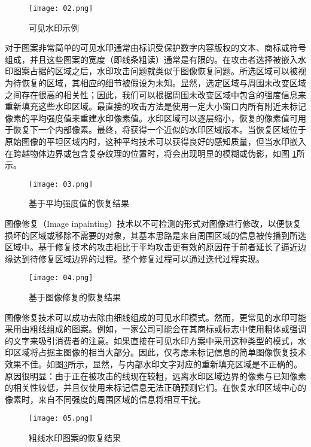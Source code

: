 \begin{figure}[!htbp]
	\centering
	\texttt{[image: 02.png]}
	\caption{可见水印示例}
\end{figure}

对于图案非常简单的可见水印通常由标识受保护数字内容版权的文本、商标或符号组成，并且这些图案的宽度（即线条粗读）通常是有限的。在攻击者选择被嵌入水印图案占据的区域之后，水印攻击问题就类似于图像恢复问题。所选区域可以被视为待恢复的区域，其相应的细节被假设为未知。显然，选定区域与周围未改变区域之间存在很高的相关性；因此，我们可以根据周围未改变区域中包含的强度信息来重新填充这些水印区域。最直接的攻击方法是使用一定大小窗口内所有附近未标记像素的平均强度值来重建水印像素值。水印区域可以逐层缩小，恢复的像素值可用于恢复下一个内部像素。最终，将获得一个近似的水印区域版本。当恢复区域位于原始图像的平坦区域内时，这种平均技术可以获得良好的感知质量，但当水印嵌入在跨越物体边界或包含复杂纹理的位置时，将会出现明显的模糊或伪影，如图 \ref{fig:03}所示。

\begin{figure}[!htbp]
	\centering
	\texttt{[image: 03.png]}
	\caption{基于平均强度值的恢复结果}
	\label{fig:03}
\end{figure}

图像修复（Image inpainting）技术以不可检测的形式对图像进行修改，以便恢复损坏的区域或移除不需要的对象，其基本思路是来自周围区域的信息被传播到所选区域中。基于修复技术的攻击相比于平均攻击更有效的原因在于前者延长了逼近边缘达到待修复区域边界的过程。整个修复过程可以通过迭代过程实现。

\begin{figure}[!htbp]
	\centering
	\texttt{[image: 04.png]}
	\caption{基于图像修复的恢复结果}
	\label{fig:04}
\end{figure}

图像修复技术可以成功去除由细线组成的可见水印模式。然而，更常见的水印可能采用由粗线组成的图案。例如，一家公司可能会在其商标或标志中使用粗体或强调的文字来吸引消费者的注意。如果直接在可见水印方案中采用这种类型的模式，水印区域将占据主图像的相当大部分。因此，仅考虑未标记信息的简单图像恢复技术效果不佳。如图\ref{fig:05}所示，显然，与内部水印文字对应的重新填充区域是不正确的。原因很明显：由于正在被攻击的线现在较粗，远离水印区域边界的像素与已知像素的相关性较低，并且仅使用未标记信息无法正确预测它们。在恢复水印区域中心的像素时，来自不同强度的周围区域的信息将相互干扰。

\begin{figure}[!htbp]
	\centering
	\texttt{[image: 05.png]}
	\caption{粗线水印图案的恢复结果}
	\label{fig:05}
\end{figure}

